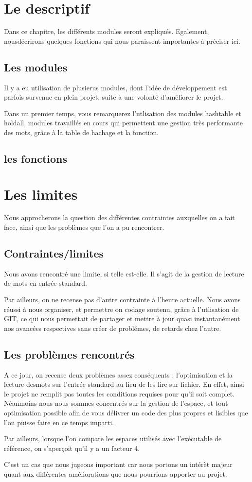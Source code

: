 \documentclass[12pt, letterpaper]{report}
\begin{document}
\chapter{Le descriptif}

Dans ce chapitre, les différents modules seront expliqués. Egalement, nousdécrirons quelques fonctions
qui nous paraissent importantes à préciser ici.

\section{Les modules}
Il y a eu utilisation de plusierus modules, dont l'idée de développement est parfois survenue
en plein projet, suite à une volonté d'améliorer le projet.

Dans un premier temps, vous remarquerez l'utlisation des modules hashtable et holdall,
modules travaillés en cours qui permettent une gestion très performante des mots, grâce
à la table de hachage et la fonction.
\section{les fonctions}

\chapter{Les limites}
Nous approcherons la question des différentes contraintes 
auxquelles on a fait face, ainsi que les problèmes que l'on a pu rencontrer.

\section{Contraintes/limites}
Nous avons rencontré une limite, si telle est-elle. Il s'agit de la gestion 
de lecture de mots en entrée standard. 

Par ailleurs, on ne recense pas d'autre contrainte à l'heure actuelle.
Nous avons réussi à nous organiser, et permettre on codage soutenu,
grâce à l'utlisation de GIT, ce qui nous permettait de partager et mettre à jour quasi instantanément nos avancées respectives sans 
créer de problémes, de retards chez l'autre.



\section{Les problèmes rencontrés}

A ce jour, on recense deux problèmes assez conséquents : l'optimisation et la lecture desmots sur l'entrée standard
au lieu de les lire sur fichier.
En effet, ainsi le projet ne remplit pas toutes les conditions requises pour qu'il soit complet. 
Néanmoins nous nous sommes concentrés sur la gestion de l'espace, et tout optimisation possible
afin de vous délivrer un code des plus propres et lisibles que l'on puisse faire 
en ce temps imparti.


Par ailleurs, lorsque l'on compare les espaces utilisés avec l'exécutable de référence, 
on s'aperçoit qu'il y a un facteur 4. 

C'est un cas que nous jugeons important car nous portons un 
intérèt majeur quant aux différentes améliorations que nous pourrions
apporter au projet.
\end{document}
